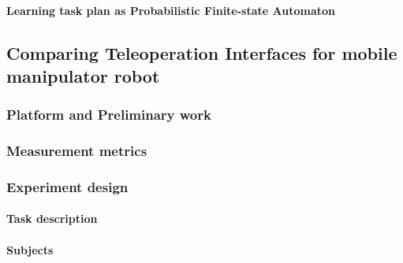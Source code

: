 

\paragraph*{Learning task plan as Probabilistic Finite-state Automaton}



\subsection{Comparing Teleoperation Interfaces for mobile manipulator robot}\label{sec:plan-interface}

\subsubsection{Platform and Preliminary work}\label{sec:plan-interface-hardware}

\subsubsection{Measurement metrics}\label{sec:plan-interface-metrics}

\subsubsection{Experiment design}\label{sec:plan-interface-exp}

\paragraph{Task description}


\paragraph{Subjects}


